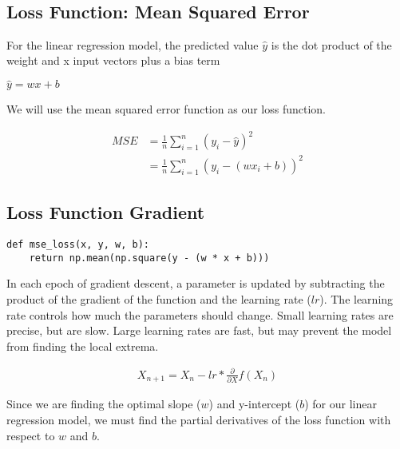 \documentclass[openany]{book}
\begin{document}
    \begin{center}
    \end{center}
    { \hspace*{\fill} \\}
    
    \subsection{Loss Function: Mean Squared
Error}\label{loss-function-mean-squared-error}

    For the linear regression model, the predicted value \(\hat{y}\) is the
dot product of the weight and x input vectors plus a bias term

\(\hat{y} = w x + b\)

We will use the mean squared error function as our loss function.

\begin{align*}
MSE &= \frac{1}{n} \sum_{i=1}^{n}(y_{i}-\hat{y})^2 \\
&= \frac{1}{n} \sum_{i=1}^{n}(y_{i}-(w x_{i} + b))^2
\end{align*}

    \subsection{Loss Function Gradient}\label{loss-function-gradient}

    \begin{tcolorbox}
\tiny
\begin{verbatim}
def mse_loss(x, y, w, b):
    return np.mean(np.square(y - (w * x + b)))
\end{verbatim}
\end{tcolorbox}

    In each epoch of gradient descent, a parameter is updated by subtracting
the product of the gradient of the function and the learning rate
(\(lr\)). The learning rate controls how much the parameters should
change. Small learning rates are precise, but are slow. Large learning
rates are fast, but may prevent the model from finding the local
extrema.

\begin{align*}
X_{n+1} = X_n - lr * \frac{\partial}{\partial X} f(X_n)
\end{align*}

Since we are finding the optimal slope (\(w\)) and y-intercept (\(b\))
for our linear regression model, we must find the partial derivatives of
the loss function with respect to \(w\) and \(b\).
\end{document}
